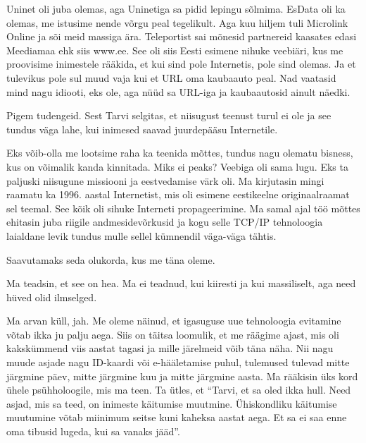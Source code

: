 Uninet oli juba olemas, aga Uninetiga sa pidid lepingu sõlmima. 
EsData oli ka olemas, me istusime nende võrgu peal tegelikult. 
Aga kuu hiljem tuli Microlink Online ja sõi meid massiga 
ära.  Teleportist sai mõnesid partnereid kaasates edasi 
Meediamaa ehk siis www.ee. See oli siis Eesti 
esimene nihuke veebiäri, kus me proovisime inimestele rääkida, et kui sind pole 
Internetis, pole sind olemas. Ja et tulevikus pole sul muud vaja kui et URL oma 
kaubaauto peal. Nad vaatasid mind nagu idiooti, eks ole, aga nüüd sa URL-iga ja 
kaubaautosid ainult näedki. 


Pigem  tudengeid. Sest Tarvi selgitas, et niisugust teenust turul ei ole ja see 
tundus väga lahe, kui inimesed saavad juurdepääsu Internetile. 


Eks võib-olla me lootsime raha ka teenida mõttes, tundus nagu olematu bisness, 
kus on võimalik kanda kinnitada. Miks ei peaks? Veebiga oli sama lugu. Eks ta 
paljuski niisugune missiooni ja eestvedamise värk oli. Ma kirjutasin mingi 
raamatu ka 1996. aastal  Internetist, mis oli esimene eestikeelne 
originaalraamat sel teemal. See kõik oli sihuke Interneti propageerimine. Ma samal ajal  
töö mõttes ehitasin juba riigile andmesidevõrkusid ja kogu selle TCP/IP 
tehnoloogia  laialdane levik tundus mulle sellel kümnendil väga-väga tähtis.


Saavutamaks seda olukorda, kus me täna oleme. 


Ma teadsin, et see on hea. Ma ei teadnud, kui kiiresti ja kui massiliselt, aga  
need hüved olid ilmselged. 


Ma arvan küll, jah. Me oleme näinud, et igasuguse uue tehnoloogia evitamine 
võtab ikka ju palju aega. Siis on täitsa loomulik, et me räägime ajast, mis oli 
 kakskümmend viis aastat tagasi ja mille järelmeid võib täna näha. Nii nagu 
muude asjade nagu ID-kaardi  või e-hääletamise puhul,  tulemused tulevad  mitte 
järgmine päev, mitte järgmine kuu ja mitte järgmine aasta. Ma rääkisin üks kord 
ühele psühholoogile, mis ma teen. Ta ütles, et \enquote{Tarvi, et sa oled ikka 
hull. Need asjad, mis sa teed, on inimeste käitumise muutmine. Ühiskondliku 
käitumise muutumine võtab miinimum seitse kuni kaheksa aastat aega. Et sa ei 
saa enne oma tibusid lugeda, kui sa vanaks jääd}.

